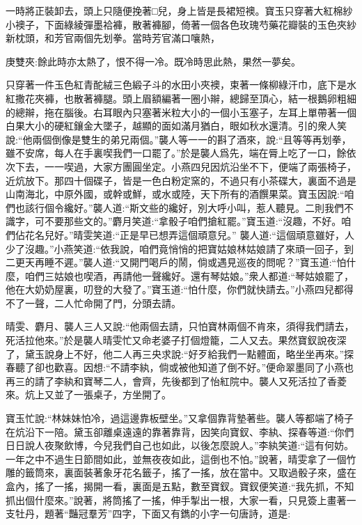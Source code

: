 \begin{parag}
    一時將正裝卸去，頭上只隨便挽著□兒，身上皆是長裙短襖。寶玉只穿著大紅棉紗小襖子，下面綠綾彈墨袷褲，散著褲腳，倚著一個各色玫瑰芍藥花瓣裝的玉色夾紗新枕頭，和芳官兩個先划拳。當時芳官滿口嚷熱，\begin{note}庚雙夾:餘此時亦太熱了，恨不得一冷。既冷時思此熱，果然一夢矣。\end{note}只穿著一件玉色紅青酡絨三色緞子斗的水田小夾襖，束著一條柳綠汗巾，底下是水紅撒花夾褲，也散著褲腿。頭上眉額編著一圈小辮，總歸至頂心，結一根鵝卵粗細的總辮，拖在腦後。右耳眼內只塞著米粒大小的一個小玉塞子，左耳上單帶著一個白果大小的硬紅鑲金大墜子，越顯的面如滿月猶白，眼如秋水還清。引的衆人笑說:“他兩個倒像是雙生的弟兄兩個。”襲人等一一的斟了酒來，說:“且等等再划拳，雖不安席，每人在手裏喫我們一口罷了。”於是襲人爲先，端在脣上吃了一口，餘依次下去，一一喫過，大家方團圓坐定。小燕四兒因炕沿坐不下，便端了兩張椅子，近炕放下。那四十個碟子，皆是一色白粉定窯的，不過只有小茶碟大，裏面不過是山南海北，中原外國，或幹或鮮，或水或陸，天下所有的酒饌果菜。寶玉因說:“咱們也該行個令纔好。”襲人道:“斯文些的纔好，別大呼小叫，惹人聽見。二則我們不識字，可不要那些文的。”麝月笑道:“拿骰子咱們搶紅罷。”寶玉道:“沒趣，不好。咱們佔花名兒好。”晴雯笑道:“正是早已想弄這個頑意兒。” 襲人道:“這個頑意雖好，人少了沒趣。”小燕笑道:“依我說，咱們竟悄悄的把寶姑娘林姑娘請了來頑一回子，到二更天再睡不遲。”襲人道:“又開門喝戶的鬧，倘或遇見巡夜的問呢？”寶玉道:“怕什麼，咱們三姑娘也喫酒，再請他一聲纔好。還有琴姑娘。”衆人都道:“琴姑娘罷了，他在大奶奶屋裏，叨登的大發了。”寶玉道:“怕什麼，你們就快請去。”小燕四兒都得不了一聲，二人忙命開了門，分頭去請。
\end{parag}


\begin{parag}
    晴雯、麝月、襲人三人又說:“他兩個去請，只怕寶林兩個不肯來，須得我們請去，死活拉他來。”於是襲人晴雯忙又命老婆子打個燈籠，二人又去。果然寶釵說夜深了，黛玉說身上不好，他二人再三央求說:“好歹給我們一點體面，略坐坐再來。”探春聽了卻也歡喜。因想:“不請李紈，倘或被他知道了倒不好。”便命翠墨同了小燕也再三的請了李紈和寶琴二人，會齊，先後都到了怡紅院中。襲人又死活拉了香菱來。炕上又並了一張桌子，方坐開了。
\end{parag}


\begin{parag}
    寶玉忙說:“林妹妹怕冷，過這邊靠板壁坐。”又拿個靠背墊著些。襲人等都端了椅子在炕沿下一陪。黛玉卻離桌遠遠的靠著靠背，因笑向寶釵、李紈、探春等道:“你們日日說人夜聚飲博，今兒我們自己也如此，以後怎麼說人。”李紈笑道:“這有何妨。一年之中不過生日節間如此，並無夜夜如此，這倒也不怕。”說著，晴雯拿了一個竹雕的籤筒來，裏面裝著象牙花名籤子，搖了一搖，放在當中。又取過骰子來，盛在盒內，搖了一搖，揭開一看，裏面是五點，數至寶釵。寶釵便笑道:“我先抓，不知抓出個什麼來。”說著，將筒搖了一搖，伸手掣出一根，大家一看，只見簽上畫著一支牡丹，題著“豔冠羣芳”四字，下面又有鐫的小字一句唐詩，道是:
\end{parag}



